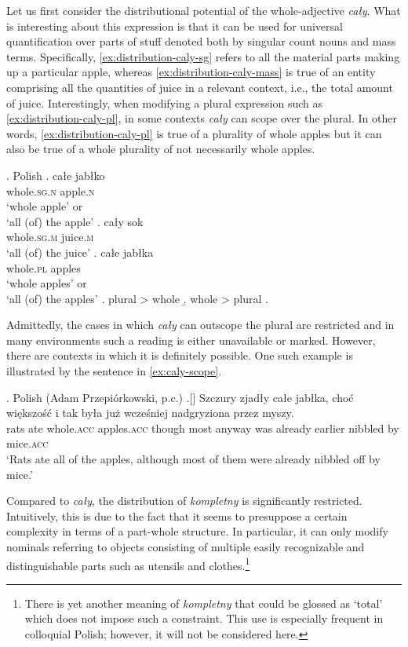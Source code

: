 Let us first consider the distributional potential of the whole-adjective \textit{cały}. What is interesting about this expression is that it can be used for universal quantification over parts of stuff denoted both by singular count nouns and mass terms. Specifically, \ref{ex:distribution-caly-sg} refers to all the material parts making up a particular apple, whereas \ref{ex:distribution-caly-mass} is true of an entity comprising all the quantities of juice in a relevant context, i.e., the total amount of juice. Interestingly, when modifying a plural expression such as \ref{ex:distribution-caly-pl}, in some contexts \textit{cały} can scope over the plural. In other words, \ref{ex:distribution-caly-pl} is true of a plurality of whole apples but it can also be true of a whole plurality of not necessarily whole apples.\largerpage[-1]\pagebreak

		\ex. Polish\label{ex:distribution-caly}
        \ag. całe jabłko\label{ex:distribution-caly-sg}\\
		whole\textsc{.sg.n} apple\textsc{.n}\\
		`whole apple' or\\`all (of) the apple'
        \bg. cały sok\label{ex:distribution-caly-mass}\\
		whole\textsc{.sg.m} juice\textsc{.m}\\
		`all (of) the juice'
		\bg. całe jabłka\label{ex:distribution-caly-pl}\\
		whole\textsc{.pl} apples\\
		`whole apples' or\\`all (of) the apples'
        \a. plural > whole
        \b. whole > plural
        \z.

Admittedly, the cases in which \textit{cały} can outscope the plural are restricted and in many environments such a reading is either unavailable or marked. However, there are contexts in which it is definitely possible. One such example is illustrated by the sentence in \ref{ex:caly-scope}.

\ex. Polish (Adam Przepiórkowski, p.c.)\label{ex:caly-scope}
\bg.[] Szczury zjadły całe jabłka, choć większość {i tak} była już wcześniej nadgryziona przez myszy.\\
rats ate whole\textsc{.acc} apples\textsc{.acc} though most anyway was already earlier nibbled by mice\textsc{.acc}\\
`Rats ate all of the apples, although most of them were already nibbled off by mice.'
		
Compared to \textit{cały}, the distribution of \textit{kompletny} is significantly restricted. Intuitively, this is due to the fact that it seems to presuppose a certain complexity in terms of a part-whole structure. In particular, it can only modify nominals referring to objects consisting of multiple easily recognizable and distinguishable parts such as utensils and clothes.\footnote{There is yet another meaning of \textit{kompletny} that could be glossed as `total' which does not impose such a constraint. This use is especially frequent in colloquial Polish; however, it will not be considered here.} 

